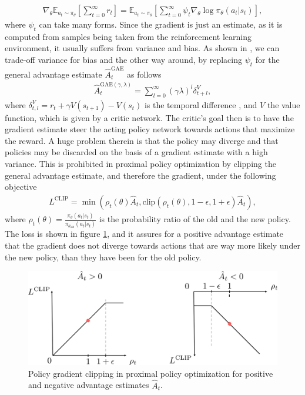 \begin{align}
	\nabla_\theta\mathbb{E}_{a_t\sim\pi_\theta}\left[\sum_{t=0}^\infty r_t\right] = \mathbb{E}_{a_t\sim\pi_\theta}\left[\sum_{t=0}^\infty\psi_t\nabla_\theta\log\pi_\theta(a_t|s_t)\right],
\end{align}
where $\psi_t$ can take many forms. Since the gradient is just an estimate, as it is computed from samples being taken from the reinforcement learning environment, it usually suffers from variance and bias. As shown in \cite{schulman2015high}, we can trade-off variance for bias and the other way around, by replacing $\psi_t$ for the general advantage estimate $\hat{A}^\text{GAE}_t$ as follows
\begin{align}
	\hat{A}^{\text{GAE}(\gamma,\lambda)}_t = \sum_{l=0}^\infty(\gamma\lambda)^l\delta_{t+l}^V,
	\label{eq::223_gae}
\end{align}
where $\delta^V_{t,l} = r_t + \gamma V(s_{t+1}) - V(s_t)$ is the temporal difference \cite{sutton1998introduction}, and $V$ the value function, which is given by a critic network. The critic's goal then is to have the gradient estimate steer the acting policy network towards actions that maximize the reward. A huge problem therein is that the policy may diverge and that policies may be discarded on the basis of a gradient estimate with a high variance. This is prohibited in proximal policy optimization by clipping the general advantage estimate, and therefore the gradient, under the following objective
\begin{align}
	L^\text{CLIP} = \min(\rho_t(\theta)\hat{A}_t, \text{clip}(\rho_t(\theta), 1-\epsilon, 1+\epsilon)\hat{A}_t),
	\label{eq::223_clip}
\end{align}
where $\rho_t(\theta) = \frac{\pi_\theta(a_t|s_t)}{\pi_{\theta_\text{old}}(a_t|s_t)}$ is the probability ratio of the old and the new policy. The loss is shown in figure \ref{fig::223_ppo}, and it assures for a positive advantage estimate that the gradient does not diverge towards actions that are way more likely under the new policy, than they have been for the old policy.
\begin{figure}[h!]
	\centering
	\includegraphics[scale=.35]{chapters/02_background/img/ppo_objective.png}
	\caption{Policy gradient clipping in proximal policy optimization for positive and negative advantage estimates $\hat{A}_t$.}
	\label{fig::223_ppo}
\end{figure}
